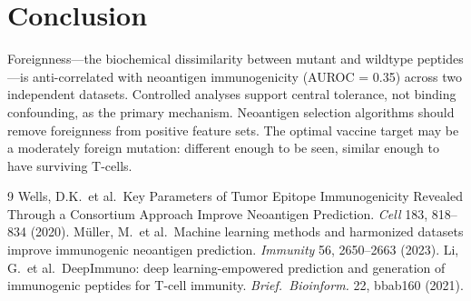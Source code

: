 \documentclass[11pt,twocolumn]{article}
\begin{document}
\section{Conclusion}

Foreignness---the biochemical dissimilarity between mutant and wildtype peptides---is anti-correlated with neoantigen immunogenicity (AUROC = 0.35) across two independent datasets. Controlled analyses support central tolerance, not binding confounding, as the primary mechanism. Neoantigen selection algorithms should remove foreignness from positive feature sets. The optimal vaccine target may be a moderately foreign mutation: different enough to be seen, similar enough to have surviving T-cells.

\begin{thebibliography}{9}
 Wells, D.K.\ et al.\ Key Parameters of Tumor Epitope Immunogenicity Revealed Through a Consortium Approach Improve Neoantigen Prediction. \textit{Cell} 183, 818--834 (2020).
 M\"{u}ller, M.\ et al.\ Machine learning methods and harmonized datasets improve immunogenic neoantigen prediction. \textit{Immunity} 56, 2650--2663 (2023).
 Li, G.\ et al.\ DeepImmuno: deep learning-empowered prediction and generation of immunogenic peptides for T-cell immunity. \textit{Brief.\ Bioinform.} 22, bbab160 (2021).
\end{thebibliography}
\end{document}

